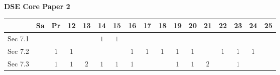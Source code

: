 \documentclass[12pt, a4paper]{article}
\begin{document}
\begin{absolutelynopagebreak}
\begin{center}
\textbf{DSE Core Paper 2}
\end{center}
\begin{center}
\begin{tabular}{|l|c|c|c|c|c|c|c|c|c|c|c|c|c|c|c|c|}
\hline
        & Sa & Pr & 12 & 13 & 14 & 15 & 16 & 17 & 18 & 19 & 20 & 21 & 22 & 23 & 24 & 25 \\\hline\hline
Sec 7.1 &  &  &  &  &  $1$ &  $1$ &  &  &  &  &  &  &  &  &  &  \\\hline
Sec 7.2 &  &  $1$ &  $1$ &  &  &  &  $1$ &  $1$ &  $1$ &  $1$ &  $1$ &  &  $1$ &  $1$ &  $1$ &  \\\hline
Sec 7.3 &  &  $1$ &  $1$ &  $2$ &  $1$ &  $1$ &  $1$ &  &  &  $1$ &  $1$ &  $2$ &  &  $1$ &  &  \\\hline
\end{tabular}
\end{center}
\end{absolutelynopagebreak}
\end{document}
